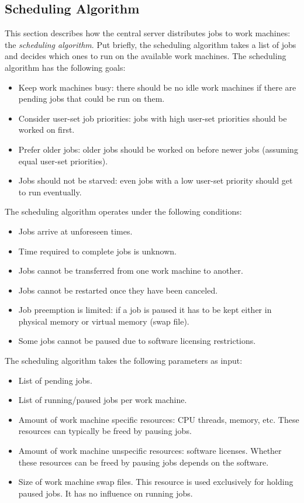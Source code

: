 \subsection{Scheduling Algorithm}
This section describes how the central server distributes jobs to work machines: the \textit{scheduling algorithm}.
Put briefly, the scheduling algorithm takes a list of jobs and decides which ones to run on the available work machines.
The scheduling algorithm has the following goals:
\begin{itemize}
\item Keep work machines busy: there should be no idle work machines if there are pending jobs that could be run on them.
\item Consider user-set job priorities: jobs with high user-set priorities should be worked on first.
\item Prefer older jobs: older jobs should be worked on before newer jobs (assuming equal user-set priorities).
\item Jobs should not be starved: even jobs with a low user-set priority should get to run eventually.
\end{itemize}
The scheduling algorithm operates under the following conditions:
\begin{itemize}
\item Jobs arrive at unforeseen times.
\item Time required to complete jobs is unknown.
\item Jobs cannot be transferred from one work machine to another.
\item Jobs cannot be restarted once they have been canceled.
\item Job preemption is limited: if a job is paused it has to be kept either in physical memory or virtual memory (swap file).
\item Some jobs cannot be paused due to software licensing restrictions.
\end{itemize}
The scheduling algorithm takes the following parameters as input:
\begin{itemize}
\item List of pending jobs.
\item List of running/paused jobs per work machine.
\item Amount of work machine specific resources: CPU threads, memory, etc.
These resources can typically be freed by pausing jobs.
\item Amount of work machine unspecific resources: software licenses.
Whether these resources can be freed by pausing jobs depends on the software.
\item Size of work machine swap files.
This resource is used exclusively for holding paused jobs.
It has no influence on running jobs.
\end{itemize}
